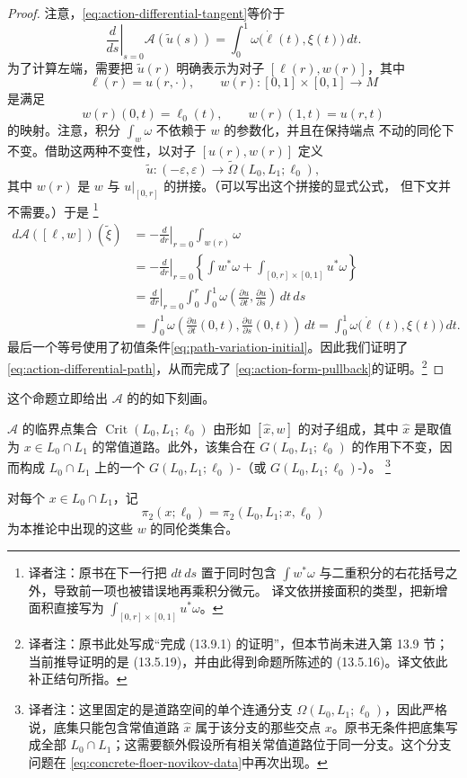 \begin{proof}
注意，\eqref{eq:action-differential-tangent}等价于
\begin{equation}
  \left.\frac{d}{ds}\right|_{s=0}
  \mathcal A(\widetilde u(s))
  =\int_0^1\omega\bigl(\dot\ell(t),\xi(t)\bigr)\,dt.
\label{eq:action-differential-path}
\end{equation}
为了计算左端，需要把 $\widetilde u(r)$ 明确表示为对子
$[\ell(r),w(r)]$，其中
\[
  \ell(r)=u(r,\mathord\cdot),
  \qquad
  w(r):[0,1]\times[0,1]\longrightarrow M
\]
是满足
\[
  w(r)(0,t)=\ell_0(t),
  \qquad
  w(r)(1,t)=u(r,t)
\]
的映射。注意，积分 $\int_w\omega$ 不依赖于 $w$ 的参数化，并且在保持端点
不动的同伦下不变。借助这两种不变性，以对子 $[u(r),w(r)]$ 定义
\[
  \widetilde u:(-\varepsilon,\varepsilon)
  \longrightarrow\widetilde\Omega(L_0,L_1;\ell_0),
\]
其中 $w(r)$ 是 $w$ 与 $u|_{[0,r]}$ 的拼接。（可以写出这个拼接的显式公式，
但下文并不需要。）于是
\footnote{译者注：原书在下一行把 $dt\,ds$ 置于同时包含
$\int w^*\omega$ 与二重积分的右花括号之外，导致前一项也被错误地再乘积分微元。
译文依拼接面积的类型，把新增面积直接写为
$\int_{[0,r]\times[0,1]}u^*\omega$。}
\begin{align*}
  d\mathcal A([\ell,w])(\widetilde\xi)
  &=-\left.\frac{d}{dr}\right|_{r=0}
    \int_{w(r)}\omega\\
  &=-\left.\frac{d}{dr}\right|_{r=0}
    \left\{\int w^*\omega
      +\int_{[0,r]\times[0,1]}u^*\omega\right\}\\
  &=\left.\frac{d}{dr}\right|_{r=0}
    \int_0^r\int_0^1
      \omega\left(\frac{\partial u}{\partial t},
        \frac{\partial u}{\partial s}\right)\,dt\,ds\\
  &=\int_0^1
      \omega\left(\frac{\partial u}{\partial t}(0,t),
        \frac{\partial u}{\partial s}(0,t)\right)\,dt
    =\int_0^1\omega\bigl(\dot\ell(t),\xi(t)\bigr)\,dt.
\end{align*}
最后一个等号使用了初值条件\eqref{eq:path-variation-initial}。因此我们证明了
\eqref{eq:action-differential-path}，从而完成了
\eqref{eq:action-form-pullback}的证明。\footnote{译者注：原书此处写成“完成
(13.9.1) 的证明”，但本节尚未进入第 13.9 节；当前推导证明的是
(13.5.19)，并由此得到命题所陈述的 (13.5.16)。译文依此补正结句所指。}
\end{proof}

这个命题立即给出 $\mathcal A$ 的\termCriticalPointSet{}的如下刻画。

\begin{corollary}
\label{cor:action-critical-points}
$\mathcal A$ 的临界点集合 $\operatorname{Crit}(L_0,L_1;\ell_0)$ 由形如
$[\widehat x,w]$ 的对子组成，其中 $\widehat x$ 是取值为
$x\in L_0\cap L_1$ 的常值道路。此外，该集合在
$G(L_0,L_1;\ell_0)$ 的作用下不变，因而构成 $L_0\cap L_1$ 上的一个
$G(L_0,L_1;\ell_0)$-\termPrincipalBundle{}（或
$G(L_0,L_1;\ell_0)$-\termTorsor{}）。
\footnote{译者注：这里固定的是道路空间的单个连通分支
$\Omega(L_0,L_1;\ell_0)$，因此严格说，底集只能包含常值道路
$\widehat x$ 属于该分支的那些交点 $x$。原书无条件把底集写成全部
$L_0\cap L_1$；这需要额外假设所有相关常值道路位于同一分支。这个分支问题在
\eqref{eq:concrete-floer-novikov-data}中再次出现。}
\end{corollary}

对每个 $x\in L_0\cap L_1$，记
\[
  \pi_2(x;\ell_0)=\pi_2(L_0,L_1;x,\ell_0)
\]
为本推论中出现的这些 $w$ 的同伦类集合。
